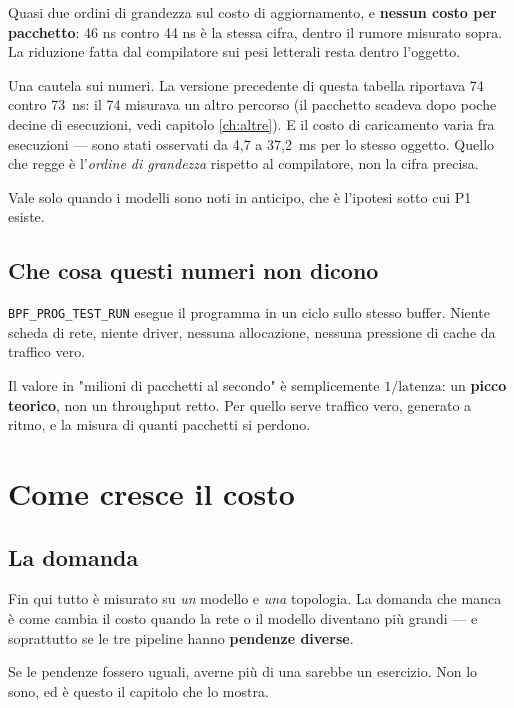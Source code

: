 \documentclass[11pt,a4paper,oneside]{report}
\begin{document}
\begin{lezione}
Quasi due ordini di grandezza sul costo di aggiornamento, e \textbf{nessun
costo per pacchetto}: 46 ns contro 44 ns è la stessa cifra, dentro il rumore
misurato sopra. La riduzione fatta dal compilatore sui pesi letterali resta
dentro l'oggetto.
\end{lezione}

Una cautela sui numeri. La versione precedente di questa tabella riportava
74 contro 73~ns: il 74 misurava un altro percorso (il pacchetto scadeva dopo poche
decine di esecuzioni, vedi capitolo \ref{ch:altre}). E il costo di caricamento
varia fra esecuzioni --- sono stati osservati da 4,7 a 37,2~ms per lo stesso
oggetto. Quello che regge è l'\emph{ordine di grandezza} rispetto al compilatore,
non la cifra precisa.

Vale solo quando i modelli sono noti in anticipo, che è l'ipotesi sotto cui P1
esiste.

\section{Che cosa questi numeri non dicono}

\texttt{BPF\_PROG\_TEST\_RUN} esegue il programma in un ciclo sullo stesso
buffer. Niente scheda di rete, niente driver, nessuna allocazione, nessuna
pressione di cache da traffico vero.

Il valore in "milioni di pacchetti al secondo" è semplicemente $1/\text{latenza}$:
un \textbf{picco teorico}, non un throughput retto. Per quello serve traffico
vero, generato a ritmo, e la misura di quanti pacchetti si perdono.

\chapter{Come cresce il costo}

\section{La domanda}

Fin qui tutto è misurato su \emph{un} modello e \emph{una} topologia. La domanda
che manca è come cambia il costo quando la rete o il modello diventano più
grandi --- e soprattutto se le tre pipeline hanno \textbf{pendenze diverse}.

Se le pendenze fossero uguali, averne più di una sarebbe un esercizio. Non lo
sono, ed è questo il capitolo che lo mostra.
\end{document}
